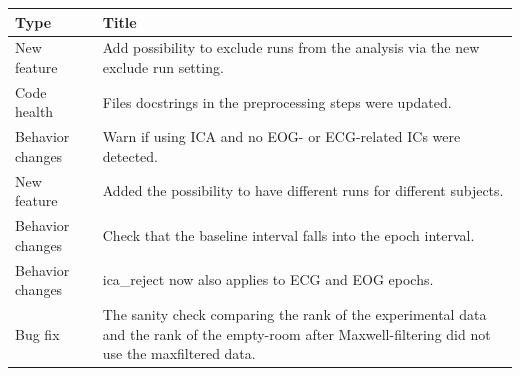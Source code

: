 \begin{table}[ht]
    \centering
    \begin{tabular}{@{}| p{3cm}|p{9cm}| @{}}
        \hline
        Type             & Title                                                                                                                                                                                                                                                                       \\
        \hline
        New feature      & Add possibility to exclude runs from the analysis via the new exclude run setting.                                                                                                                                                                                          \\
        Code health      & Files docstrings in the preprocessing steps were updated.                                                                                                                                                                                                                   \\
        Behavior changes & Warn if using ICA and no EOG- or ECG-related ICs were detected.                                                                                                                                                                                                             \\
        New feature      & Added the possibility to have different runs for different subjects.                                                                                                                                                                                                        \\
        Behavior changes & Check that the baseline interval falls into the epoch interval.                                                                                                                                                                                                             \\
        Behavior changes & ica\_reject now also applies to ECG and EOG epochs.                                                                                                                                                                                                                         \\
        Bug fix          & The sanity check comparing the rank of the experimental data and the rank of the empty-room after Maxwell-filtering did not use the maxfiltered data.                                                                                                                       \\

\end{tabular}
\end{table}
